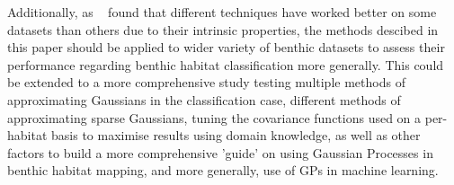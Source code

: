\documentclass[journal]{IEEEtran}
\begin{document}
Additionally, as ~\citet{ahsan11} found that different techniques have worked better on some datasets than others due to their intrinsic properties, the methods descibed in this paper should be applied to wider variety of benthic datasets to assess their performance regarding benthic habitat classification more generally. This could be extended to a more comprehensive study testing multiple methods of approximating Gaussians in the classification case, different methods of approximating sparse Gaussians, tuning the covariance functions used on a per-habitat basis to maximise results using domain knowledge, as well as other factors to build a more comprehensive 'guide' on using Gaussian Processes in benthic habitat mapping, and more generally, use of GPs in machine learning.


%

\ifCLASSOPTIONcaptionsoff
  \newpage
\fi



\end{document}
